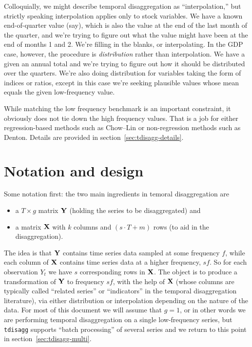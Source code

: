 Colloquially, we might describe temporal disaggregation as
``interpolation,'' but strictly speaking interpolation applies only to
stock variables. We have a known end-of-quarter value (say), which is
also the value at the end of the last month of the quarter, and we're
trying to figure out what the value might have been at the end of
months 1 and 2. We're filling in the blanks, or interpolating. In the
GDP case, however, the procedure is \textit{distribution} rather than
interpolation. We have a given an annual total and we're trying to
figure out how it should be distributed over the quarters. We're also
doing distribution for variables taking the form of indices or ratios,
except in this case we're seeking plausible values whose mean equals
the given low-frequency value.

While matching the low frequency benchmark is an important constraint,
it obviously does not tie down the high frequency values. That is a
job for either regression-based methods such as Chow--Lin or
non-regression methods such as Denton. Details are provided in
section~\ref{sec:tdisagg-details}.

\section{Notation and design}
\label{sec:tdisagg-nd}

Some notation first: the two main ingredients in temoral
disaggregation are
\begin{itemize}
\item a $T \times g$ matrix $\mathbf{Y}$ (holding the series to be
  disaggregated) and
\item a matrix $\mathbf{X}$ with $k$ columns and $(s \cdot T + m)$ rows (to
  aid in the disaggregation).
\end{itemize}
The idea is that $\mathbf{Y}$ contains time series data sampled at some
frequency $f$, while each column of $\mathbf{X}$ contains time series data at
a higher frequency, $sf$. So for each observation $Y_t$ we have $s$
corresponding rows in $\mathbf{X}$. The object is to produce a transformation
of $\mathbf{Y}$ to frequency $sf$, with the help of $\mathbf{X}$ (whose columns are
typically called ``related series'' or ``indicators'' in the temporal
disaggregation literature), via either distribution or interpolation
depending on the nature of the data. For most of this document we will
assume that $g = 1$, or in other words we are performing temporal
disaggregation on a single low-frequency series, but \texttt{tdisagg}
supports ``batch processing'' of several series and we return to this
point in section~\ref{sec:tdisagg-multi}.

